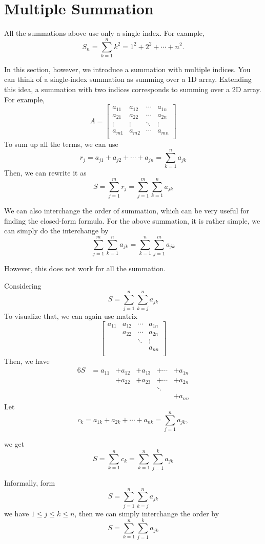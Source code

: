 \section{Multiple Summation}
All the summations above use only a single index. For example, 
\[
	S_n = \sum_{k = 1}^n k^2 = 1^2 + 2^2 + \cdots + n^2.
\]

In this section, however, we introduce a summation with multiple indices. You can think of a single-index summation as summing over a 1D array. Extending this idea, a summation with two indices corresponds to summing over a 2D array. For example,
\[
	A = \begin{bmatrix}
		a_{11} & a_{12} & \cdots & a_{1n}  \\
		a_{21} & a_{22} & \cdots & a_{2n}  \\
		\vdots & \vdots & \ddots & \vdots  \\
		a_{m1} & a_{m2} & \cdots & a_{mn}  \\
	\end{bmatrix}
\]
To sum up all the terms, we can use
\[
	r_j = a_{j1} + a_{j2} + \cdots + a_{jn} = \sum_{k = 1}^n a_{jk} 
\]
Then, we can rewrite it as
\[
	S = \sum_{j = 1}^m r_j = \sum_{j = 1}^m\sum_{k = 1}^n a_{jk}
\]

We can also interchange the order of summation, which can be very useful for finding the closed-form formula. For the above summation, it is rather simple, we can simply do the interchange by
\[
	\sum_{j = 1}^m\sum_{k = 1}^n a_{jk} = \sum_{k = 1}^n\sum_{j = 1}^m a_{jk}
\]

However, this does not work for all the summation.
\begin{eg}
	Considering
	\[
		S = \sum_{j = 1}^n \sum_{k = j}^n a_{jk}
	\]
	To visualize that, we can again use matrix
	\[
		\begin{bmatrix}
		a_{11} & a_{12} & \cdots & a_{1n}  \\
			& a_{22} & \cdots & a_{2n}  \\
			&	& \ddots & \vdots  \\
			& 	&	& a_{nn}  \\
		\end{bmatrix}
	\]
	Then, we have
	\begin{alignat*}{6}
		S &= a_{11} &+ a_{12} &+ a_{13} &+ \cdots &+ a_{1n} \\
		&	&+ a_{22} &+ a_{23} &+ \cdots &+ a_{2n} \\
		&	&	&	&\ddots &\\
		&	&	&	&	&+ a_{nn}
	\end{alignat*}
	Let \[
	c_k = a_{1k}  + a_{2k} + \cdots + a_{nk} = \sum_{j = 1}^n a_{jk}, \]

	we get
	\[
		S = \sum_{k = 1}^n c_k = \sum_{k = 1}^n \sum_{j = 1}^k a_{jk}
	\]
	\begin{remark}
		Informally, form
		\[
			S = \sum_{j = 1}^n \sum_{k = j}^n a_{jk}
		\]
		we have \(1 \leq j \leq k \leq n\), then we can simply interchange the order by
		\[
			S = \sum_{k = 1}^n \sum_{j = 1}^{k} a_{jk}
		\]
	\end{remark}
\end{eg}

